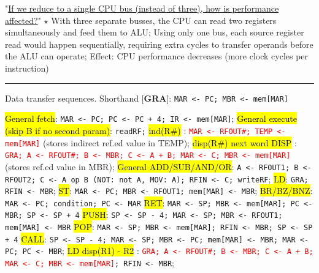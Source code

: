\documentclass[a4paper]{article}
\newcommand{\hlblue}[1]{%
    {%
    \sethlcolor{SkyBlue}%
    \hl{#1}%
    }%
}
\begin{document}
\begin{multicols*}{2}
\begin{minipage}{0.25\textwidth}
    "\ul{If we reduce to a single CPU bus (instead of three), how is performance affected?}"
    $\star$ With three separate busses, the CPU can read two registers simultaneously and feed them to ALU; Using only one bus, each source register read would happen sequentially, requiring extra cycles to transfer operands before the ALU can operate; Effect: CPU performance decreases (more clock cycles per instruction)
  \end{minipage}

  \rule{1\linewidth}{0.4pt}

  Data transfer sequences. Shorthand [\textbf{GRA}]: \texttt{MAR <- PC; MBR <- mem[MAR]}

  \hl{General fetch}: \texttt{MAR <- PC; PC <- PC + 4; IR <- mem[MAR]};
  \hl{General execute (skip B if no second param)}: \texttt{readRF;}
  \hlblue{ind(R\#)}: \texttt{\textcolor{red}{MAR <- RFOUT\#; TEMP <- mem[MAR]}} (stores indirect ref.ed value in TEMP);
  \hlblue{disp(R\#) next word DISP}: \texttt{\textcolor{red}{GRA; A <- RFOUT\#; B <- MBR; C <- A + B; MAR <- C; MBR <- mem[MAR]}} (stores ref.ed value in MBR);
  \hl{General ADD/SUB/AND/OR}: \texttt{A <- RFOUT1; B <- RFOUT2; C <- A op B (NOT: not A, MOV: A); RFIN <- C; writeRF};
  \hl{LD}: \texttt{GRA; RFIN <- MBR};
  \hl{ST}: \texttt{MAR <- PC; MBR <- RFOUT1; mem[MAR] <- MBR};
  \hl{BR/BZ/BNZ}: \texttt{MAR <- PC; condition; PC <- MAR}
  \hl{RET}: \texttt{MAR <- SP; MBR <- mem[MAR]; PC <- MBR; SP <- SP + 4}
  \hl{PUSH}: \texttt{SP <- SP - 4; MAR <- SP; MBR <- RFOUT1; mem[MAR] <- MBR}
  \hl{POP}: \texttt{MAR <- SP; MBR <- mem[MAR]; RFIN <- MBR; SP <- SP + 4}
  \hl{CALL}: \texttt{SP <- SP - 4; MAR <- SP; MBR <- PC; mem[MAR] <- MBR; MAR <- PC; PC <- MBR};
  \hlblue{LD disp(R1) - R2}: \texttt{\textcolor{red}{GRA; A <- RFOUT\#; B <- MBR; C <- A + B; MAR <- C; MBR <- mem[MAR]}; RFIN <- MBR};



\end{multicols*}
\end{document}
